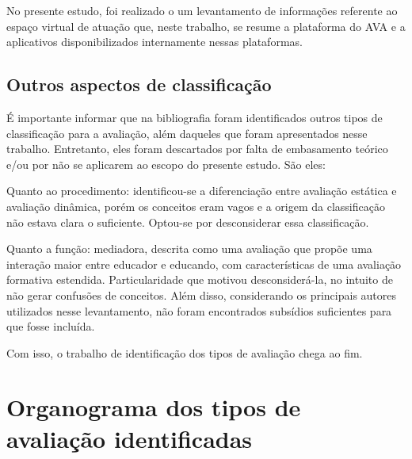 No presente estudo, foi realizado o um levantamento de informações referente ao espaço virtual de atuação que, neste trabalho, se resume a plataforma do AVA e a aplicativos disponibilizados internamente nessas plataformas. 

\subsection{Outros aspectos de classificação}%
É importante informar que na bibliografia foram identificados outros tipos de classificação para a avaliação, além daqueles que foram apresentados nesse trabalho. Entretanto, eles foram descartados por falta de embasamento teórico e/ou por não se aplicarem ao escopo do presente estudo. São eles:

Quanto ao procedimento: identificou-se a diferenciação entre avaliação estática e avaliação dinâmica, porém os conceitos eram vagos e a origem da classificação não estava clara o suficiente. Optou-se por desconsiderar essa classificação.

Quanto a função: mediadora, descrita como uma avaliação que propõe uma interação maior entre educador e educando, com características de uma avaliação formativa estendida. Particularidade que motivou desconsiderá-la, no intuito de não gerar confusões de conceitos. Além disso, considerando os principais autores utilizados nesse levantamento, não foram encontrados subsídios suficientes para que fosse incluída. 

Com isso, o trabalho de identificação dos tipos de avaliação chega ao fim. 

\section{Organograma dos tipos de avaliação identificadas}%


